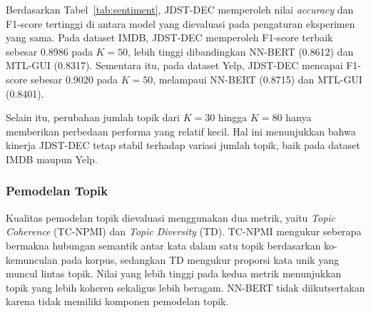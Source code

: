 Berdasarkan Tabel~\ref{tab:sentiment}, JDST-DEC memperoleh nilai
\textit{accuracy} dan F1-score tertinggi di antara model yang
dievaluasi pada pengaturan eksperimen yang sama. Pada dataset IMDB,
JDST-DEC memperoleh F1-score terbaik sebesar 0.8986 pada $K=50$, lebih
tinggi dibandingkan NN-BERT (0.8612) dan MTL-GUI (0.8317). Sementara
itu, pada dataset Yelp, JDST-DEC mencapai F1-score sebesar 0.9020 pada
$K=50$, melampaui NN-BERT (0.8715) dan MTL-GUI (0.8401).

Selain itu, perubahan jumlah topik dari $K=30$ hingga $K=80$ hanya
memberikan perbedaan performa yang relatif kecil. Hal ini menunjukkan
bahwa kinerja JDST-DEC tetap stabil terhadap variasi jumlah topik,
baik pada dataset IMDB maupun Yelp.

\subsubsection{Pemodelan Topik}

Kualitas pemodelan topik dievaluasi menggunakan dua metrik, yaitu
\textit{Topic Coherence} (TC-NPMI) dan \textit{Topic Diversity} (TD).
TC-NPMI mengukur seberapa bermakna hubungan semantik antar kata dalam satu
topik berdasarkan ko-kemunculan pada korpus, sedangkan TD mengukur proporsi
kata unik yang muncul lintas topik. Nilai yang lebih tinggi pada kedua
metrik menunjukkan topik yang lebih koheren sekaligus lebih beragam.
NN-BERT tidak diikutsertakan karena tidak memiliki komponen pemodelan topik.

